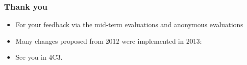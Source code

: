 \begin{frame}\frametitle{Thank you}
	\begin{itemize}
		\item	For your feedback via the mid-term evaluations and anonymous evaluations
		\item	Many changes proposed from 2012 were implemented in 2013:
		\pause
		\item	{See you in 4C3.}
	\end{itemize}
\end{frame}

\begin{frame}\frametitle{}
	\begin{exampleblock}{}
		\begin{center}\huge {}
		\end{center}
	\end{exampleblock}
\end{frame}